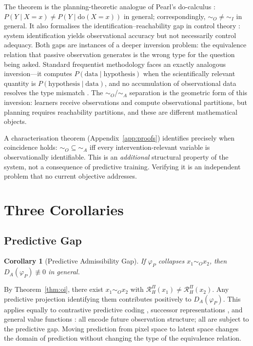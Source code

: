\documentclass[10pt,twocolumn]{article}
\theoremstyle{plain}
\newtheorem{corollary}{Corollary}
\theoremstyle{definition}
\theoremstyle{remark}
\newcommand{\simA}{\sim_{\!A}}
\newcommand{\simO}{\sim_{\!O}}
\newcommand{\simI}{\sim_{\!I}}
\newcommand{\RHP}{\mathcal{R}_{H}^{\Pi}}
\begin{document}
The theorem is the planning-theoretic analogue of Pearl's do-calculus
\citep{pearl2009causality}: $P(Y\mid X=x)\neq P(Y\mid\mathrm{do}(X=x))$ in
general; correspondingly, $\simO\neq\simI$ in general. It also formalises the
identification--reachability gap in control theory \citep{ljung1999system}: system
identification yields observational accuracy but not necessarily control adequacy.
Both gaps are instances of a deeper inversion problem: the equivalence relation
that passive observation generates is the wrong type for the question being asked.
Standard frequentist methodology faces an exactly analogous inversion---it
computes $P(\text{data}\mid\text{hypothesis})$ when the scientifically relevant
quantity is $P(\text{hypothesis}\mid\text{data})$, and no accumulation of
observational data resolves the type mismatch \citep{jaynes2003probability}.
The $\simO$/$\simA$ separation is the geometric form of this inversion: learners
receive observations and compute observational partitions, but planning requires
reachability partitions, and these are different mathematical objects.

A characterisation theorem (Appendix~\ref{app:proofs}) identifies precisely when
coincidence holds: $\simO\subseteq\simA$ iff every intervention-relevant variable
is observationally identifiable. This is an \emph{additional} structural property
of the system, not a consequence of predictive training. Verifying it is an
independent problem that no current objective addresses.

\section{Three Corollaries}
\label{sec:corollaries}

\subsection{Predictive Gap}

\begin{corollary}[Predictive Admissibility Gap]
\label{cor:pred}
If $\varphi_P$ collapses $x_1\simO x_2$, then $D_A(\varphi_P)\not\equiv 0$
in general.
\end{corollary}

By Theorem~\ref{thm:oi}, there exist $x_1\simO x_2$ with $\RHP(x_1)\neq\RHP(x_2)$.
Any predictive projection identifying them contributes positively to $D_A(\varphi_P)$.
This applies equally to contrastive predictive coding \citep{oord2018representation},
successor representations \citep{dayan1993improving}, and general value functions
\citep{sutton2011horde}: all encode future observation structure; all are subject
to the predictive gap. Moving prediction from pixel space to latent space changes
the domain of prediction without changing the type of the equivalence relation.
\end{document}
